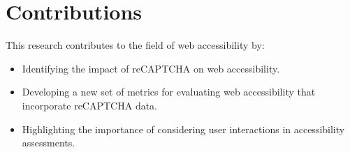 \documentclass{article}
\begin{document}
\section{Contributions}
This research contributes to the field of web accessibility by:
\begin{itemize}
    \item Identifying the impact of reCAPTCHA on web accessibility.
    \item Developing a new set of metrics for evaluating web accessibility that incorporate reCAPTCHA data.
    \item Highlighting the importance of considering user interactions in accessibility assessments.
\end{itemize}



\end{document}
